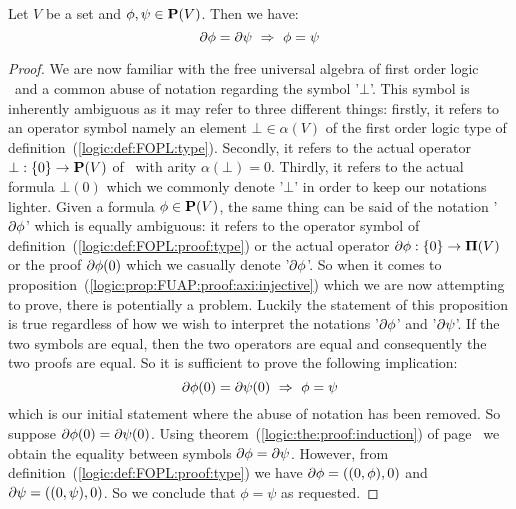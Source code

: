\begin{prop}\label{logic:prop:FUAP:proof:axi:injective}
Let $V$ be a set and $\phi,\psi\in\mbox{${\bf P}(V)$}$. Then we have:
    \[
    \axi\phi=\axi\psi\ \Rightarrow\ \phi=\psi
    \]
\end{prop}
\begin{proof}
We are now familiar with the free universal algebra of first order
logic \pv\ and a common abuse of notation regarding the symbol
'$\bot$'. This symbol is inherently ambiguous as it may refer to
three different things: firstly, it refers to an operator symbol
namely an element $\bot\in\alpha(V)$ of the first order logic type
of definition~(\ref{logic:def:FOPL:type}). Secondly, it refers to
the actual operator $\bot:\{0\}\to\mbox{${\bf P}(V)$}$ of \pv\ with arity
$\alpha(\bot)=0$. Thirdly, it refers to the actual formula $\bot(0)$
which we commonly denote '$\bot$' in order to keep our notations
lighter. Given a formula $\phi\in\mbox{${\bf P}(V)$}$, the same thing can be said of
the notation '$\mbox{$\partial$}\phi$' which is equally ambiguous: it refers to
the operator symbol of definition~(\ref{logic:def:FOPL:proof:type})
or the actual operator $\mbox{$\partial$}\phi:\{0\}\to\mbox{${\bf\Pi}(V)$}$ or the proof
$\mbox{$\partial$}\phi(0)$ which we casually denote '$\mbox{$\partial$}\phi$'. So when it
comes to proposition~(\ref{logic:prop:FUAP:proof:axi:injective})
which we are now attempting to prove, there is potentially a
problem. Luckily the statement of this proposition is true
regardless of how we wish to interpret the notations '$\mbox{$\partial$}\phi$'
and '$\mbox{$\partial$}\psi$'. If the two symbols are equal, then the two
operators are equal and consequently the two proofs are equal. So it
is sufficient to prove the following implication:
    \[
    \axi\phi(0)=\axi\psi(0)\ \Rightarrow\ \phi=\psi
    \]
which is our initial statement where the abuse of notation has been
removed. So suppose $\mbox{$\partial$}\phi(0)=\mbox{$\partial$}\psi(0)$. Using
theorem~(\ref{logic:the:proof:induction}) of
page~\pageref{logic:the:proof:induction} we obtain the equality
between symbols $\mbox{$\partial$}\phi=\mbox{$\partial$}\psi$. However, from
definition~(\ref{logic:def:FOPL:proof:type}) we have
$\mbox{$\partial$}\phi=((0,\phi),0)$ and $\mbox{$\partial$}\psi=((0,\psi),0)$. So we conclude
that $\phi=\psi$ as requested.
\end{proof}
